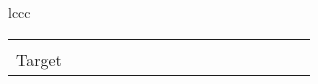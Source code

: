 \documentclass[twoside,11pt]{article}
\begin{document}
\begin{table*}[t]
{\begin{tabular}{lccc}
{\begin{figure*}
\begin{sc}
\begin{small}
\begin{tabular}{r@{\hskip 0.5cm} ccc c@{\hskip 0.4cm} ccc c@{\hskip 0.4cm} ccc c@{\hskip 0.4cm} ccc}
    \example{syn_0.png} &
    \example{syn_1.png} &
    \example{syn_2.png} & &
    
    \example{svhn_3.png} &
    \example{svhn_4.png} &
    \example{svhn_5.png} & &
    
    \example{synsgn_3.png} &
    \example{synsgn_4.png} &
    \example{synsgn_5.png}\\
    
    Target &
    \example{mnisti_0.png} &
    \example{mnisti_1.png} &
    \example{mnisti_2.png} & &
    
    \example{svhn_0.png} &
    \example{svhn_1.png} &
    \example{svhn_2.png} & &
    
    \example{mnist_4.png} &
    \example{mnist_5.png} &
    \example{mnist_6.png} & &
    
    \example{gtsrb_2.png} &
    \example{gtsrb_3.png} &
    \example{gtsrb_4.png}\\
    

\end{tabular}
\end{small}
\end{sc}
\end{figure*}}
\end{tabular}}
\end{table*}
\end{document}
